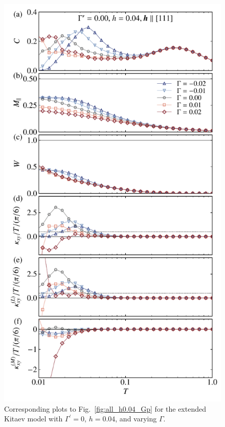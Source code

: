 \documentclass[twocolumn,superscriptaddress,showpacs, longbibliography, aps, prx]{revtex4-2}
\begin{document}
\begin{figure}[tbh]
  \begin{center}
    \includegraphics[width=\linewidth]{Data_for_figs/plot/fig-10-XTRG-gamma_dep-004.pdf}
  \end{center}
  \caption{
 Corresponding plots to Fig.~\ref{fig:all_h0.04_Gp} for the extended Kitaev model with $\Gamma^{\prime}=0$, $h=0.04$, and varying $\Gamma$. 
  }
  \label{fig:all_h0.04_G}
\end{figure}
\end{document}
